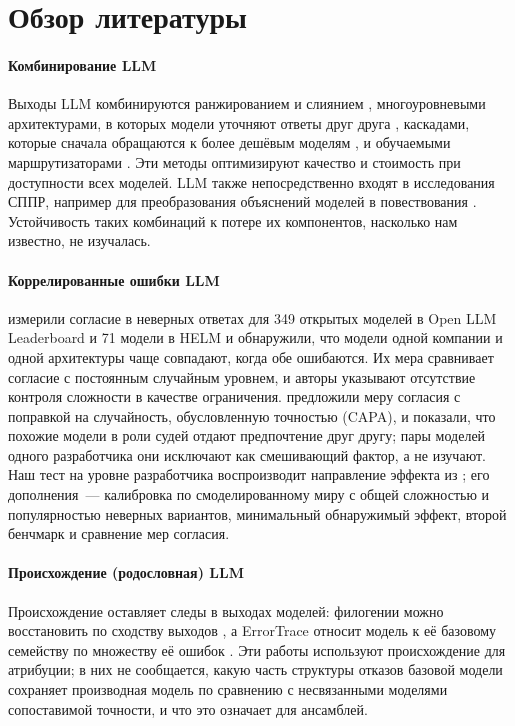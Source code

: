 \documentclass[preprint,12pt,authoryear]{elsarticle}
\begin{document}
\section{Обзор литературы}

\paragraph{Комбинирование LLM} Выходы LLM комбинируются ранжированием и слиянием \citep{jiang2023blender}, многоуровневыми архитектурами, в которых модели уточняют ответы друг друга \citep{wang2025moa}, каскадами, которые сначала обращаются к более дешёвым моделям \citep{chen2024frugalgpt}, и обучаемыми маршрутизаторами \citep{ong2025routellm}. Эти методы оптимизируют качество и стоимость при доступности всех моделей. LLM также непосредственно входят в исследования СППР, например для преобразования объяснений моделей в повествования \citep{martens2025}. Устойчивость таких комбинаций к потере их компонентов, насколько нам известно, не изучалась.

\paragraph{Коррелированные ошибки LLM} \citet{kim2025correlated} измерили согласие в неверных ответах для 349 открытых моделей в Open LLM Leaderboard и 71 модели в HELM и обнаружили, что модели одной компании и одной архитектуры чаще совпадают, когда обе ошибаются. Их мера сравнивает согласие с постоянным случайным уровнем, и авторы указывают отсутствие контроля сложности в качестве ограничения. \citet{goel2025great} предложили меру согласия с поправкой на случайность, обусловленную точностью (CAPA), и показали, что похожие модели в роли судей отдают предпочтение друг другу; пары моделей одного разработчика они исключают как смешивающий фактор, а не изучают. Наш тест на уровне разработчика воспроизводит направление эффекта из \citet{kim2025correlated}; его дополнения~--- калибровка по смоделированному миру с общей сложностью и популярностью неверных вариантов, минимальный обнаружимый эффект, второй бенчмарк и сравнение мер согласия.

\paragraph{Происхождение (родословная) LLM} Происхождение оставляет следы в выходах моделей: филогении можно восстановить по сходству выходов \citep{yax2025phylolm}, а ErrorTrace относит модель к её базовому семейству по множеству её ошибок \citep{zang2025errortrace}. Эти работы используют происхождение для атрибуции; в них не сообщается, какую часть структуры отказов базовой модели сохраняет производная модель по сравнению с несвязанными моделями сопоставимой точности, и что это означает для ансамблей.
\end{document}
